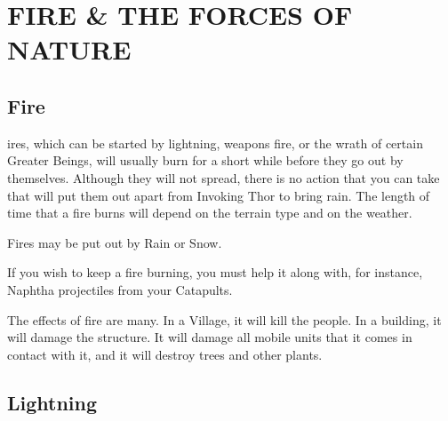
\chapter[Fire \& the Forces of Nature]{{\Huge F}IRE {\Huge \&} THE {\Huge F}ORCES OF {\Huge N}ATURE}

\section{Fire}


ires, which can be started by lightning, weapons fire, or the wrath of certain Greater Beings, will usually burn for a short while before they go out by themselves. Although they will not spread, there is no action that you can take that will put them out apart from Invoking Thor to bring rain. The length of time that a fire burns will depend on the terrain type and on the weather.

Fires may be put out by Rain or Snow.

If you wish to keep a fire burning, you must help it along with, for instance, Naphtha projectiles from your Catapults.

The effects of fire are many. In a Village, it will kill the people. In a building, it will damage the structure. It will damage all mobile units that it comes in contact with it, and it will destroy trees and other plants.

\section{Lightning}


